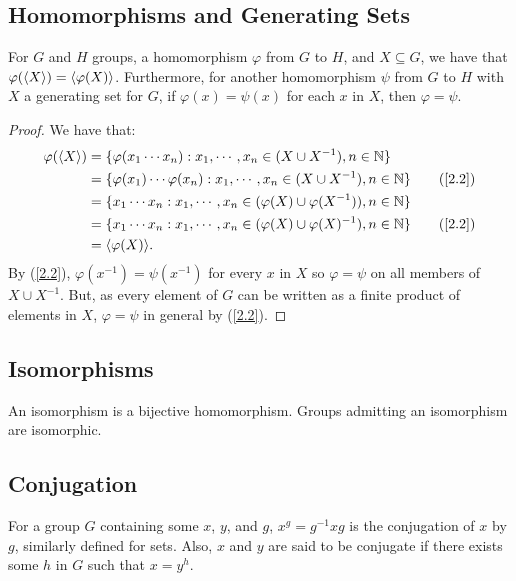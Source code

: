 \subsection{Homomorphisms and Generating Sets} \label{2.7} \label{2.8}

For $G$ and $H$ groups, a homomorphism $\varphi$ from $G$ to $H$, and $X \subseteq G$,
we have that \linebreak $\varphi({\langle X \rangle}) = {\langle \varphi(X) \rangle}$.
Furthermore, for another homomorphism $\psi$ from $G$ to $H$ with $X$
a generating set for $G$, if $\varphi(x) = \psi(x)$ for each $x$ in $X$,
then $\varphi = \psi$.

\begin{proof}
    We have that: \begin{align*}
        \varphi(\ang{X})
        &= \{\varphi(x_1 \cdots x_n) 
            : x_1, \cdots, x_n \in (X \cup X^{-1}), n \in \mb{N}\} \\
        &= \{\varphi(x_1) \cdots \varphi(x_n) 
            : x_1, \cdots, x_n \in (X \cup X^{-1}), n \in \mb{N}\} \tag{\ref{2.2}} \\
        &= \{x_1 \cdots x_n
            : x_1, \cdots, x_n \in (\varphi(X) \cup \varphi(X^{-1})), n \in \mb{N}\} \\
        &= \{x_1 \cdots x_n
            : x_1, \cdots, x_n \in (\varphi(X) \cup \varphi(X)^{-1}), n \in \mb{N}\} 
            \tag{\ref{2.2}} \\
        &= \ang{\varphi(X)}.
    \end{align*} By (\ref{2.2}), $\varphi(x^{-1}) = \psi(x^{-1})$ for every $x$ in $X$
    so $\varphi = \psi$ on all members of $X \cup X^{-1}$. But, as every element of
    $G$ can be written as a finite product of elements in $X$, $\varphi = \psi$
    in general by (\ref{2.2}).
\end{proof}

\subsection{Isomorphisms}

An isomorphism is a bijective homomorphism. Groups admitting an isomorphism are
isomorphic.

\subsection{Conjugation}

For a group $G$ containing some $x$, $y$, and $g$,
$x^g = g^{-1}xg$ is the conjugation of $x$ by $g$, similarly defined
for sets. Also, $x$ and $y$ are said to be conjugate if there exists some $h$ in
$G$ such that $x = y^h$.

